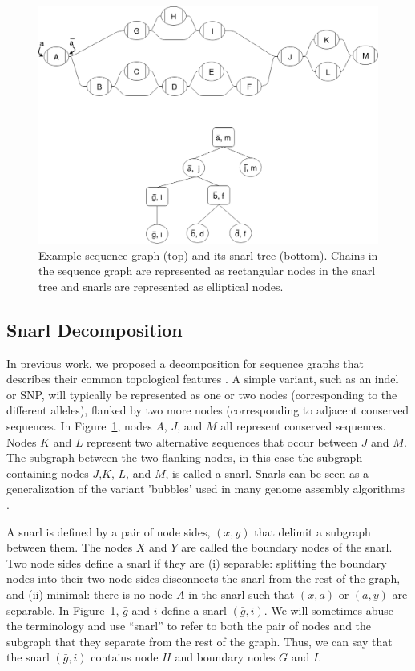 \documentclass[11pt]{ucscthesis}
\begin{document}
\begin{figure}
\centering
\includegraphics[width=0.8\columnwidth]{aim1_examplegraph.png}
\caption[Snarl tree example]{Example sequence graph (top) and its snarl tree (bottom). Chains in the sequence graph are represented as rectangular nodes in the snarl tree and snarls are represented as elliptical nodes.}
\label{fig:aim1_examplegraph}
\end{figure}

\subsection{Snarl Decomposition}
In previous work, we proposed a decomposition for sequence graphs that describes their common topological features \cite{paten_superbubbles_2018}. 
A simple variant, such as an indel or SNP, will typically be represented as one or two nodes (corresponding to the different alleles), flanked by two more nodes (corresponding to adjacent conserved sequences. 
In Figure~\ref{fig:aim1_examplegraph}, nodes $A$, $J$, and $M$ all represent conserved sequences.
Nodes $K$ and $L$ represent two alternative sequences that occur between $J$ and $M$.
The subgraph between the two flanking nodes, in this case the subgraph containing nodes $J$,$K$, $L$, and $M$, is called a snarl.
Snarls can be seen as a generalization of the variant 'bubbles' used in many genome assembly algorithms \cite{paten_superbubbles_2018}.

A snarl is defined by a pair of node sides, $(x, y)$ that delimit a subgraph between them.
The nodes $X$ and $Y$ are called the boundary nodes of the snarl.
Two node sides define a snarl if they are (i) separable: splitting the boundary nodes into their two node sides disconnects the snarl from the rest of the graph, and (ii) minimal: there is no node $A$ in the snarl such that $(x, a)$ or $(\bar{a}, y)$ are separable.
In Figure~\ref{fig:aim1_examplegraph}, $\bar{g}$ and $i$ define a snarl $(\bar{g}, i)$.
We will sometimes abuse the terminology and use ``snarl'' to refer to both the pair of nodes and the subgraph that they separate from the rest of the graph.
Thus, we can say that the snarl $(\bar{g}, i)$ contains node $H$ and boundary nodes $G$ and $I$.
\end{document}
